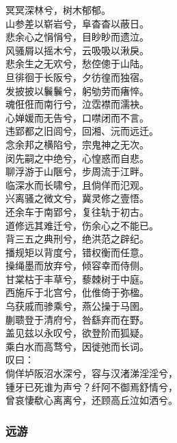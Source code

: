 \documentclass[]{article}
\begin{document}
冥冥深林兮，树木郁郁。\\
山参差以崭岩兮，阜杳杳以蔽日。\\
悲余心之悁悁兮，目眇眇而遗泣。\\
风骚屑以摇木兮，云吸吸以湫戾。\\
悲余生之无欢兮，愁倥傯于山陆。\\
旦徘徊于长阪兮，夕彷徨而独宿。\\
发披披以鬤鬤兮，躬劬劳而瘏悴。\\
魂俇俇而南行兮，泣霑襟而濡袂。\\
心婵媛而无告兮，口噤闭而不言。\\
违郢都之旧闾兮，回湘、沅而远迁。\\
念余邦之横陷兮，宗鬼神之无次。\\
闵先嗣之中绝兮，心惶惑而自悲。\\
聊浮游于山陿兮，步周流于江畔。\\
临深水而长啸兮，且倘佯而氾观。\\
兴离骚之微文兮，冀灵修之壹悟。\\
还余车于南郢兮，复往轨于初古。\\
道修远其难迁兮，伤余心之不能已。\\
背三五之典刑兮，绝洪范之辟纪。\\
播规矩以背度兮，错权衡而任意。\\
操绳墨而放弃兮，倾容幸而侍侧。\\
甘棠枯于丰草兮，藜棘树于中庭。\\
西施斥于北宫兮，仳倠倚于弥楹。\\
乌获戚而骖乘兮，燕公操于马圉。\\
蒯聩登于清府兮，咎繇弃而在野。\\
盖见兹以永叹兮，欲登阶而狐疑。\\
乘白水而高骛兮，因徙弛而长词。\\
叹曰：\\
倘佯垆阪沼水深兮，容与汉渚涕淫淫兮，\\
锺牙已死谁为声兮？纤阿不御焉舒情兮，\\
曾哀悽欷心离离兮，还顾高丘泣如洒兮。

\hypertarget{header-n3122}{%
\subsubsection{远游}\label{header-n3122}}
\end{document}
